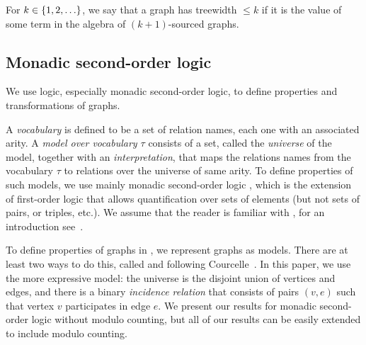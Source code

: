   \begin{definition}[Treewidth]
        For $k \in \{1,2,\ldots\}$, we say that a  graph has treewidth  $\le  k$ if it is the value of some term in the algebra of $(k+1)$-sourced graphs.
    \end{definition}

  
    

    \subsection{Monadic second-order logic}
    We  use logic, especially monadic second-order logic, to define properties and transformations of graphs. 

    A  \emph{vocabulary} is defined to be  a set of relation names, each one with an associated arity. A \emph{model over vocabulary $\tau$} consists of a set, called the \emph{universe} of the model, together with an \emph{interpretation}, that maps the relations names from the vocabulary $\tau$ to  relations over the universe of same arity. To define properties of such models, we use mainly monadic second-order logic \mso, which  is the extension of first-order logic that allows quantification over sets of elements (but not sets of pairs, or triples, etc.). We assume that the reader is familiar with \mso, for an introduction see~\cite[Section 2]{Thomas97}.
     
     
      To define properties of graphs in \mso, we represent graphs as models. There are at least two ways to do this, called  \msoone and \msotwo following 
 Courcelle~\cite[Definition 1.7]{courcelleVI}. In this paper, we use the more expressive \msotwo  model: the universe is the disjoint union of vertices and edges, and there is a binary  \emph{incidence relation} that consists of pairs $(v,e)$ such that vertex $v$ participates in edge $e$.  We present our results for monadic second-order logic without modulo counting, but all of our results can be easily extended to include modulo counting. 


